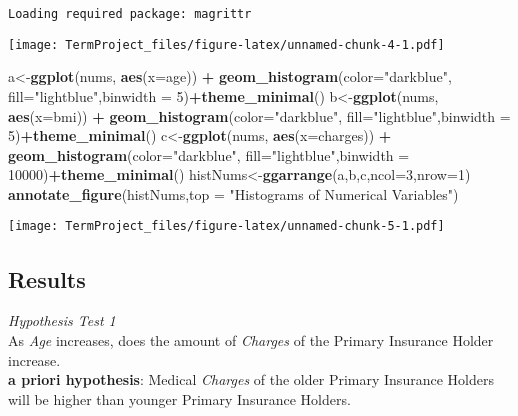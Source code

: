 \documentclass[]{article}
\newenvironment{Shaded}{\begin{snugshade}}{\end{snugshade}}
\newcommand{\DataTypeTok}[1]{\textcolor[rgb]{0.13,0.29,0.53}{#1}}
\newcommand{\DecValTok}[1]{\textcolor[rgb]{0.00,0.00,0.81}{#1}}
\newcommand{\KeywordTok}[1]{\textcolor[rgb]{0.13,0.29,0.53}{\textbf{#1}}}
\newcommand{\NormalTok}[1]{#1}
\newcommand{\OperatorTok}[1]{\textcolor[rgb]{0.81,0.36,0.00}{\textbf{#1}}}
\newcommand{\StringTok}[1]{\textcolor[rgb]{0.31,0.60,0.02}{#1}}
\begin{document}
\begin{verbatim}
Loading required package: magrittr
\end{verbatim}

\texttt{[image: TermProject\_files/figure-latex/unnamed-chunk-4-1.pdf]}

\begin{Shaded}
\begin{Highlighting}[]
\NormalTok{a<-}\KeywordTok{ggplot}\NormalTok{(nums, }\KeywordTok{aes}\NormalTok{(}\DataTypeTok{x=}\NormalTok{age)) }\OperatorTok{+}\StringTok{ }\KeywordTok{geom_histogram}\NormalTok{(}\DataTypeTok{color=}\StringTok{"darkblue"}\NormalTok{, }\DataTypeTok{fill=}\StringTok{"lightblue"}\NormalTok{,}\DataTypeTok{binwidth =} \DecValTok{5}\NormalTok{)}\OperatorTok{+}\KeywordTok{theme_minimal}\NormalTok{()}
\NormalTok{b<-}\KeywordTok{ggplot}\NormalTok{(nums, }\KeywordTok{aes}\NormalTok{(}\DataTypeTok{x=}\NormalTok{bmi)) }\OperatorTok{+}\StringTok{ }\KeywordTok{geom_histogram}\NormalTok{(}\DataTypeTok{color=}\StringTok{"darkblue"}\NormalTok{, }\DataTypeTok{fill=}\StringTok{"lightblue"}\NormalTok{,}\DataTypeTok{binwidth =} \DecValTok{5}\NormalTok{)}\OperatorTok{+}\KeywordTok{theme_minimal}\NormalTok{()}
\NormalTok{c<-}\KeywordTok{ggplot}\NormalTok{(nums, }\KeywordTok{aes}\NormalTok{(}\DataTypeTok{x=}\NormalTok{charges)) }\OperatorTok{+}\StringTok{ }\KeywordTok{geom_histogram}\NormalTok{(}\DataTypeTok{color=}\StringTok{"darkblue"}\NormalTok{, }\DataTypeTok{fill=}\StringTok{"lightblue"}\NormalTok{,}\DataTypeTok{binwidth =} \DecValTok{10000}\NormalTok{)}\OperatorTok{+}\KeywordTok{theme_minimal}\NormalTok{()}
\NormalTok{histNums<-}\KeywordTok{ggarrange}\NormalTok{(a,b,c,}\DataTypeTok{ncol=}\DecValTok{3}\NormalTok{,}\DataTypeTok{nrow=}\DecValTok{1}\NormalTok{)}
\KeywordTok{annotate_figure}\NormalTok{(histNums,}\DataTypeTok{top =} \StringTok{"Histograms of Numerical Variables"}\NormalTok{)}
\end{Highlighting}
\end{Shaded}

\texttt{[image: TermProject\_files/figure-latex/unnamed-chunk-5-1.pdf]}

\hypertarget{results}{%
\subsection{Results}\label{results}}

\emph{Hypothesis Test 1}\\
As \emph{Age} increases, does the amount of \emph{Charges} of the
Primary Insurance Holder increase.\\
\textbf{a priori hypothesis}: Medical \emph{Charges} of the older
Primary Insurance Holders will be higher than younger Primary Insurance
Holders.
\end{document}

